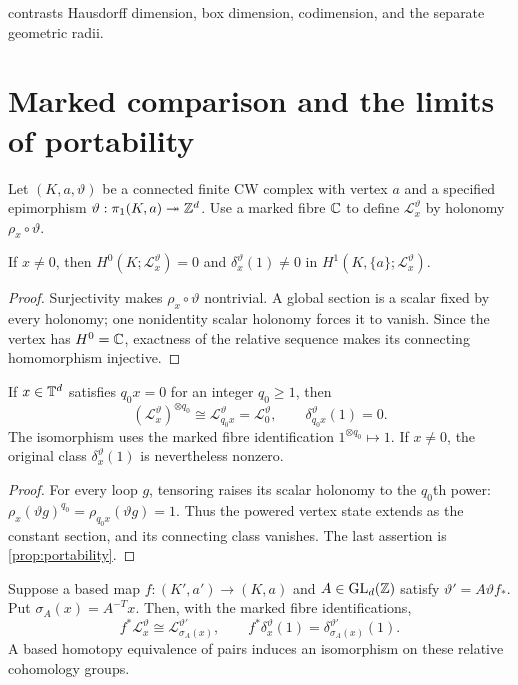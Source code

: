 \documentclass[11pt,a4paper]{article}
\begin{document}
 contrasts Hausdorff dimension, box
dimension, codimension, and the separate geometric radii.


\section{Marked comparison and the limits of portability}
\label{sec:comparison}

Let $(K,a,\vartheta)$ be a connected finite CW complex with vertex $a$
and a specified epimorphism $\vartheta:\pi_1(K,a)\twoheadrightarrow\mathbb Z^d$.
Use a marked fibre $\mathbb C$ to define $\mathcal L_x^\vartheta$ by holonomy
$\rho_x\circ\vartheta$.

\begin{proposition}\label{prop:portability}
If $x\ne0$, then
$H^0(K;\mathcal L_x^\vartheta)=0$ and
$\delta_x^\vartheta(1)\ne0$ in
$H^1(K,\{a\};\mathcal L_x^\vartheta)$.
\end{proposition}

\begin{proof}
Surjectivity makes $\rho_x\circ\vartheta$ nontrivial.  A global section
is a scalar fixed by every holonomy; one nonidentity scalar holonomy
forces it to vanish.  Since the vertex has $H^0=\mathbb C$, exactness of the
relative sequence makes its connecting homomorphism injective.
\end{proof}

\begin{corollary}
\label{cor:rational-power}
If $x\in\mathbb T^d$ satisfies $q_0x=0$ for an integer $q_0\geq1$, then
\[
 (\mathcal L_x^\vartheta)^{\otimes q_0}
       \cong\mathcal L_{q_0x}^\vartheta
       =\mathcal L_0^\vartheta,
 \qquad \delta_{q_0x}^\vartheta(1)=0.
\]
The isomorphism uses the marked fibre identification
$1^{\otimes q_0}\mapsto1$.  If $x\ne0$, the original class
$\delta_x^\vartheta(1)$ is nevertheless nonzero.
\end{corollary}

\begin{proof}
For every loop $g$, tensoring raises its scalar holonomy to the
$q_0$th power:
$\rho_x(\vartheta g)^{q_0}=\rho_{q_0x}(\vartheta g)=1$.
Thus the powered vertex state extends as the constant section, and its
connecting class vanishes.  The last assertion is \cref{prop:portability}.
\end{proof}

\begin{proposition}\label{prop:naturality}
Suppose a based map $f:(K',a')\to(K,a)$ and
$A\in\operatorname{GL}_d(\mathbb Z)$ satisfy
$\vartheta'=A\vartheta f_*$.  Put $\sigma_A(x)=A^{-T}x$.  Then, with
the marked fibre identifications,
\[
 f^*\mathcal L_x^\vartheta\cong
       \mathcal L_{\sigma_A(x)}^{\vartheta'},\qquad
 f^*\delta_x^\vartheta(1)=\delta_{\sigma_A(x)}^{\vartheta'}(1).
\]
A based homotopy equivalence of pairs induces an isomorphism on these
relative cohomology groups.
\end{proposition}
\end{document}
